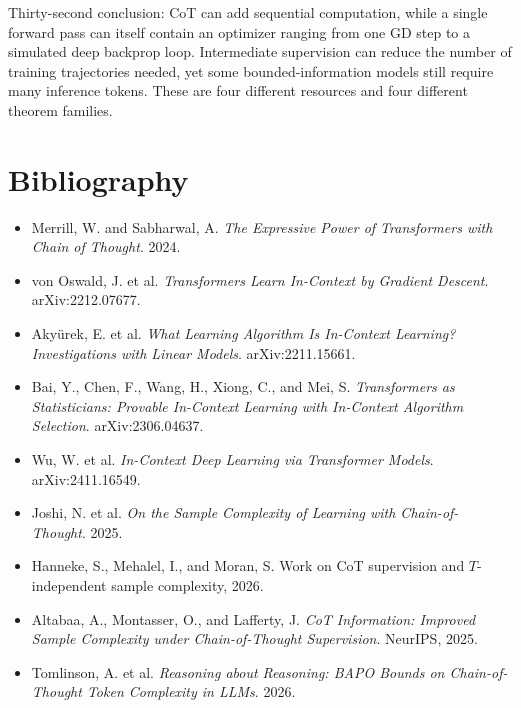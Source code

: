 \documentclass[11pt,a4paper,oneside,openany]{memoir}
\theoremstyle{definition}
\begin{document}
\begin{presentbox}
Thirty-second conclusion: CoT can add sequential computation, while a single forward pass can itself contain an optimizer ranging from one GD step to a simulated deep backprop loop.  Intermediate supervision can reduce the number of training trajectories needed, yet some bounded-information models still require many inference tokens.  These are four different resources and four different theorem families.
\end{presentbox}

\chapter*{Bibliography}
\begin{itemize}
\item Merrill, W. and Sabharwal, A. \emph{The Expressive Power of Transformers with Chain of Thought}. 2024.
\item von Oswald, J. et al. \emph{Transformers Learn In-Context by Gradient Descent}. arXiv:2212.07677.
\item Aky\"urek, E. et al. \emph{What Learning Algorithm Is In-Context Learning? Investigations with Linear Models}. arXiv:2211.15661.
\item Bai, Y., Chen, F., Wang, H., Xiong, C., and Mei, S. \emph{Transformers as Statisticians: Provable In-Context Learning with In-Context Algorithm Selection}. arXiv:2306.04637.
\item Wu, W. et al. \emph{In-Context Deep Learning via Transformer Models}. arXiv:2411.16549.
\item Joshi, N. et al. \emph{On the Sample Complexity of Learning with Chain-of-Thought}. 2025.
\item Hanneke, S., Mehalel, I., and Moran, S. Work on CoT supervision and $T$-independent sample complexity, 2026.
\item Altabaa, A., Montasser, O., and Lafferty, J. \emph{CoT Information: Improved Sample Complexity under Chain-of-Thought Supervision}. NeurIPS, 2025.
\item Tomlinson, A. et al. \emph{Reasoning about Reasoning: BAPO Bounds on Chain-of-Thought Token Complexity in LLMs}. 2026.
\end{itemize}
\end{document}
